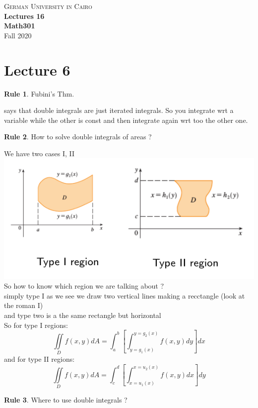 \documentclass[11pt]{article}
\theoremstyle{definition}
\newtheorem{reg}{Rule}
\begin{document}
\setcounter{section}{0}
\title{}

\thispagestyle{empty}
\begin{center}
\textsc{\LARGE German University in Cairo}\\[1.0cm]
{\LARGE \bf Lectures 16}\\ [0.5cm]
{\large \bf Math301}\\ [0.5cm]
Fall 2020
\end{center}
\tableofcontents
\section{Lecture 6}
\begin{reg}
Fubini's Thm.
\end{reg}
says that double integrals are just iterated integrals. So you integrate wrt a variable while the other is const and then integrate again wrt too the other one.
\begin{reg}
How to solve double integrals of areas ?
\end{reg}
We have two cases I, II
\includegraphics[scale=0.5]{images/1.png}\\ 
So how to know which region we are talking about ?
\\ simply type I as we see we draw two vertical lines making a recctangle (look at the roman I) \\
and type two is a the same rectangle but horizontal\\
So for type I regions:
\begin{equation}
	\iint \limits_D f(x,y) dA = \int_a^b [\int_{y=g_1(x)}^{y=g_2(x) }f(x,y) dy] dx 
\end{equation}
and for type II regions:
\begin{equation}
	\iint \limits_D f(x,y) dA = \int_c^d [\int_{x=u_1(x)}^{x=u_2(x) }f(x,y) dx] dy 
\end{equation}
\begin{reg}
Where to use double integrals ?
\end{reg}
\end{document}
